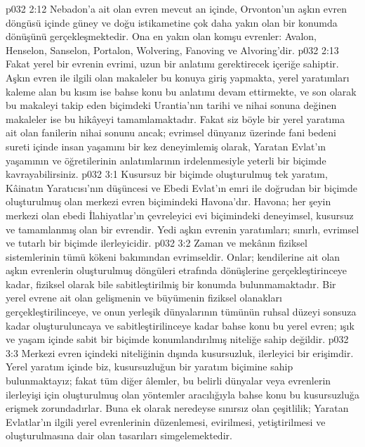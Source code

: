 \vs p032 2:12 Nebadon’a ait olan evren mevcut an içinde, Orvonton’un aşkın evren döngüsü içinde güney ve doğu istikametine çok daha yakın olan bir konumda dönüşünü gerçekleşmektedir. Ona en yakın olan komşu evrenler: Avalon, Henselon, Sanselon, Portalon, Wolvering, Fanoving ve Alvoring’dir.
\vs p032 2:13 Fakat yerel bir evrenin evrimi, uzun bir anlatımı gerektirecek içeriğe sahiptir. Aşkın evren ile ilgili olan makaleler bu konuya giriş yapmakta, yerel yaratımları kaleme alan bu kısım ise bahse konu bu anlatımı devam ettirmekte, ve son olarak bu makaleyi takip eden biçimdeki Urantia’nın tarihi ve nihai sonuna değinen makaleler ise bu hikâyeyi tamamlamaktadır. Fakat siz böyle bir yerel yaratıma ait olan fanilerin nihai sonunu ancak; evrimsel dünyanız üzerinde fani bedeni sureti içinde insan yaşamını bir kez deneyimlemiş olarak, Yaratan Evlat’ın yaşamının ve öğretilerinin anlatımlarının irdelenmesiyle yeterli bir biçimde kavrayabilirsiniz.
\vs p032 3:1 Kusursuz bir biçimde oluşturulmuş tek yaratım, Kâinatın Yaratıcısı’nın düşüncesi ve Ebedi Evlat’ın emri ile doğrudan bir biçimde oluşturulmuş olan merkezi evren biçimindeki Havona’dır. Havona; her şeyin merkezi olan ebedi İlahiyatlar’ın çevreleyici evi biçimindeki deneyimsel, kusursuz ve tamamlanmış olan bir evrendir. Yedi aşkın evrenin yaratımları; sınırlı, evrimsel ve tutarlı bir biçimde ilerleyicidir.
\vs p032 3:2 Zaman ve mekânın fiziksel sistemlerinin tümü kökeni bakımından evrimseldir. Onlar; kendilerine ait olan aşkın evrenlerin oluşturulmuş döngüleri etrafında dönüşlerine gerçekleştirinceye kadar, fiziksel olarak bile sabitleştirilmiş bir konumda bulunmamaktadır. Bir yerel evrene ait olan gelişmenin ve büyümenin fiziksel olanakları gerçekleştirilinceye, ve onun yerleşik dünyalarının tümünün ruhsal düzeyi sonsuza kadar oluşturuluncaya ve sabitleştirilinceye kadar bahse konu bu yerel evren; ışık ve yaşam içinde sabit bir biçimde konumlandırılmış niteliğe sahip değildir.
\vs p032 3:3 Merkezi evren içindeki niteliğinin dışında kusursuzluk, ilerleyici bir erişimdir. Yerel yaratım içinde biz, kusursuzluğun bir yaratım biçimine sahip bulunmaktayız; fakat tüm diğer âlemler, bu belirli dünyalar veya evrenlerin ilerleyişi için oluşturulmuş olan yöntemler aracılığıyla bahse konu bu kusursuzluğa erişmek zorundadırlar. Buna ek olarak neredeyse sınırsız olan çeşitlilik; Yaratan Evlatlar’ın ilgili yerel evrenlerinin düzenlemesi, evirilmesi, yetiştirilmesi ve oluşturulmasına dair olan tasarıları simgelemektedir.
